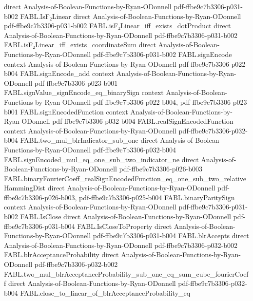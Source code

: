 \begin{theorem}
  {direct}
  {Analysis-of-Boolean-Functions-by-Ryan-ODonnell}
  {pdf-ffbe9c7b3306-p031-b002}
\proofstep
  {FABL.IsF₂Linear}
  {direct}
  {Analysis-of-Boolean-Functions-by-Ryan-ODonnell}
  {pdf-ffbe9c7b3306-p031-b002}
\proofstep
  {FABL.isF₂Linear_iff_exists_dotProduct}
  {direct}
  {Analysis-of-Boolean-Functions-by-Ryan-ODonnell}
  {pdf-ffbe9c7b3306-p031-b002}
\proofstep
  {FABL.isF₂Linear_iff_exists_coordinateSum}
  {direct}
  {Analysis-of-Boolean-Functions-by-Ryan-ODonnell}
  {pdf-ffbe9c7b3306-p031-b002}
\proofstep
  {FABL.signEncode}
  {context}
  {Analysis-of-Boolean-Functions-by-Ryan-ODonnell}
  {pdf-ffbe9c7b3306-p022-b004}
\proofstep
  {FABL.signEncode_add}
  {context}
  {Analysis-of-Boolean-Functions-by-Ryan-ODonnell}
  {pdf-ffbe9c7b3306-p023-b001}
\proofstep
  {FABL.signValue_signEncode_eq_binarySign}
  {context}
  {Analysis-of-Boolean-Functions-by-Ryan-ODonnell}
  {pdf-ffbe9c7b3306-p022-b004,
    pdf-ffbe9c7b3306-p023-b001}
\proofstep
  {FABL.signEncodedFunction}
  {context}
  {Analysis-of-Boolean-Functions-by-Ryan-ODonnell}
  {pdf-ffbe9c7b3306-p032-b004}
\proofstep
  {FABL.realSignEncodedFunction}
  {context}
  {Analysis-of-Boolean-Functions-by-Ryan-ODonnell}
  {pdf-ffbe9c7b3306-p032-b004}
\proofstep
  {FABL.two_mul_blrIndicator_sub_one}
  {direct}
  {Analysis-of-Boolean-Functions-by-Ryan-ODonnell}
  {pdf-ffbe9c7b3306-p032-b004}
\proofstep
  {FABL.signEncoded_mul_eq_one_sub_two_indicator_ne}
  {direct}
  {Analysis-of-Boolean-Functions-by-Ryan-ODonnell}
  {pdf-ffbe9c7b3306-p026-b003}
\proofstep
  {FABL.binaryFourierCoeff_realSignEncodedFunction_eq_one_sub_two_relativeHammingDist}
  {direct}
  {Analysis-of-Boolean-Functions-by-Ryan-ODonnell}
  {pdf-ffbe9c7b3306-p026-b003,
    pdf-ffbe9c7b3306-p025-b004}
\proofstep
  {FABL.binaryParitySign}
  {context}
  {Analysis-of-Boolean-Functions-by-Ryan-ODonnell}
  {pdf-ffbe9c7b3306-p031-b002}
\proofstep
  {FABL.IsClose}
  {direct}
  {Analysis-of-Boolean-Functions-by-Ryan-ODonnell}
  {pdf-ffbe9c7b3306-p031-b004}
\proofstep
  {FABL.IsCloseToProperty}
  {direct}
  {Analysis-of-Boolean-Functions-by-Ryan-ODonnell}
  {pdf-ffbe9c7b3306-p031-b004}
\proofstep
  {FABL.blrAccepts}
  {direct}
  {Analysis-of-Boolean-Functions-by-Ryan-ODonnell}
  {pdf-ffbe9c7b3306-p032-b002}
\proofstep
  {FABL.blrAcceptanceProbability}
  {direct}
  {Analysis-of-Boolean-Functions-by-Ryan-ODonnell}
  {pdf-ffbe9c7b3306-p032-b002}
\proofstep
  {FABL.two_mul_blrAcceptanceProbability_sub_one_eq_sum_cube_fourierCoeff}
  {direct}
  {Analysis-of-Boolean-Functions-by-Ryan-ODonnell}
  {pdf-ffbe9c7b3306-p032-b004}
\proofstep
  {FABL.close_to_linear_of_blrAcceptanceProbability_eq}

\end{theorem}
